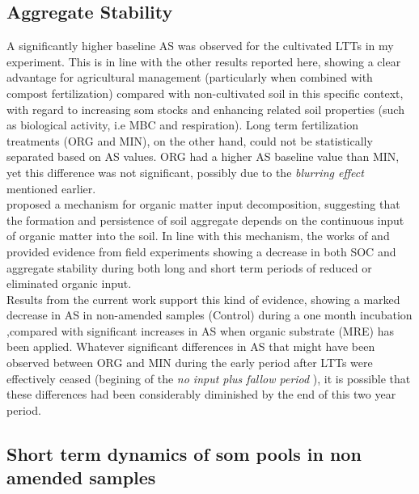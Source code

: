 \documentclass[12pt]{report}
\begin{document}
		\subsection{Aggregate Stability}
		A significantly higher baseline AS was observed for the cultivated LTTs in my experiment. This is in line with the other results reported here, showing a clear advantage for agricultural management (particularly when combined with compost fertilization) compared with non-cultivated soil in this specific context, with regard to increasing \gls{som} stocks and enhancing related soil properties (such as biological activity, i.e MBC and respiration). Long term fertilization treatments (ORG and MIN), on the other hand, could not be statistically separated based on AS values. ORG had a higher AS baseline value than MIN, yet this difference was not significant, possibly due to the \textit{blurring effect} mentioned earlier. \\
		\citep{golchin1994} proposed a mechanism for organic matter input decomposition, suggesting that the formation and persistence of soil aggregate depends on the continuous input of organic matter into the soil. In line with this mechanism, the works of \citep{li2007} and \citep{redmile-gordon2020} provided evidence from field experiments showing a decrease in both SOC and aggregate stability during both long and short term periods of reduced or eliminated organic input.\\
		Results from the current work support this kind of evidence, showing  a marked decrease in AS in non-amended samples (Control) during a one month incubation ,compared with significant increases in AS when organic substrate (MRE) has been applied.
		Whatever significant differences in AS that might have been observed between ORG and MIN during the early period after LTTs were  effectively ceased (begining of the \textit{no input plus fallow period} ), it is  possible that these differences had been considerably diminished by the end of this two year period.\\
		
		\subsection{Short term dynamics of \gls{som} pools in non amended samples}\hypertarget{subsection_4.2.2}{}
		
\end{document}
